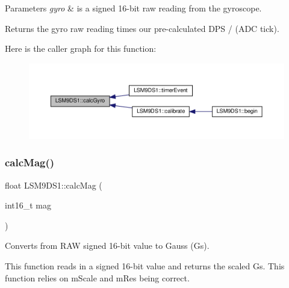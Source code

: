 \begin{DoxyParams}{Parameters}
{\em gyro} & is a signed 16-\/bit raw reading from the gyroscope. \\
\hline
\end{DoxyParams}
\begin{DoxyReturn}{Returns}
the gyro raw reading times our pre-\/calculated D\+PS / (A\+DC tick). 
\end{DoxyReturn}
Here is the caller graph for this function\+:\nopagebreak
\begin{figure}[H]
\begin{center}
\leavevmode
\includegraphics[width=350pt]{classLSM9DS1_a76707323565bc4170ea8e27a932c95e4_icgraph}
\end{center}
\end{figure}
\mbox{\label{classLSM9DS1_a7d0b0740497b1a10cd3e46a282a143ec}} 
\subsubsection{\texorpdfstring{calc\+Mag()}{calcMag()}}
{\footnotesize\ttfamily float L\+S\+M9\+D\+S1\+::calc\+Mag (\begin{DoxyParamCaption}\item[{int16\+\_\+t}]{mag }\end{DoxyParamCaption})}



Converts from R\+AW signed 16-\/bit value to Gauss (Gs). 

This function reads in a signed 16-\/bit value and returns the scaled Gs. This function relies on m\+Scale and m\+Res being correct.


